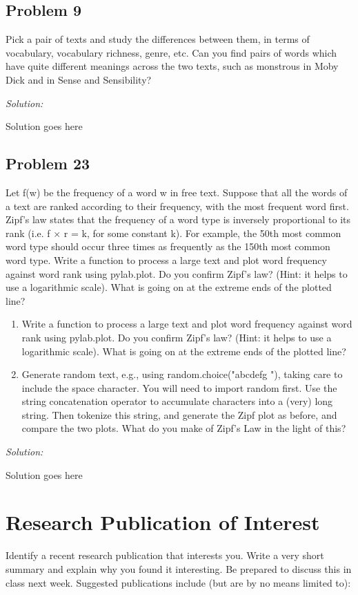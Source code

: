 \documentclass[11pt]{article}
\newenvironment{solution}{
	\vspace{10px}\noindent\emph{Solution:}
}{
	\vspace{10px}
}
\begin{document}
\subsection*{Problem 9}
Pick a pair of texts and study the differences between them, in terms of vocabulary, vocabulary richness, genre, etc. Can you find pairs of words which have quite different meanings across the two texts, such as monstrous in Moby Dick and in Sense and Sensibility?

\begin{solution}
	Solution goes here
\end{solution}  


\subsection*{Problem 23}
Let f(w) be the frequency of a word w in free text. Suppose that all the words of a text are ranked according to their frequency, with the most frequent word first. Zipf's law states that the frequency of a word type is inversely proportional to its rank (i.e. f × r = k, for some constant k). For example, the 50th most common word type should occur three times as frequently as the 150th most common word type.
Write a function to process a large text and plot word frequency against word rank using pylab.plot. Do you confirm Zipf's law? (Hint: it helps to use a logarithmic scale). What is going on at the extreme ends of the plotted line?
\begin{enumerate}
	\item Write a function to process a large text and plot word frequency against word rank using pylab.plot. Do you confirm Zipf's law? (Hint: it helps to use a logarithmic scale). What is going on at the extreme ends of the plotted line?
	\item Generate random text, e.g., using random.choice("abcdefg "), taking care to include the space character. You will need to import random first. Use the string concatenation operator to accumulate characters into a (very) long string. Then tokenize this string, and generate the Zipf plot as before, and compare the two plots. What do you make of Zipf's Law in the light of this?
\end{enumerate}

\begin{solution}
	Solution goes here
\end{solution}  


\section*{Research Publication of Interest} Identify a recent research publication that interests you. Write a very short summary and explain why you found it interesting. Be prepared to discuss this in class next week. Suggested publications include (but are by no means limited to): 

\vspace{11px}
\end{document}

